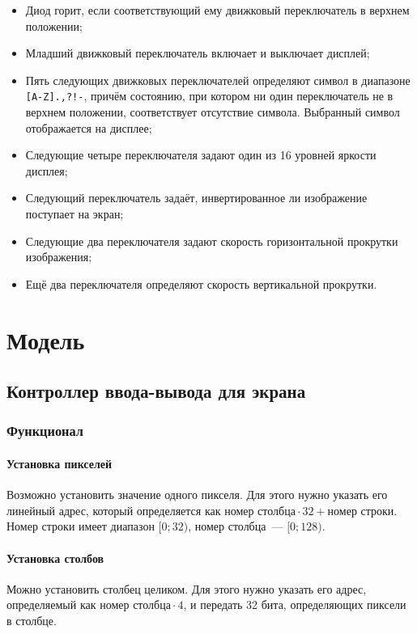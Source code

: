 \documentclass[12pt, a4paper] {ncc}
\begin{document}
\begin{itemize}
        \item Диод горит, если соответствующий ему движковый переключатель в
                верхнем положении;
        \item Младший движковый переключатель включает и выключает дисплей;
        \item Пять следующих движковых переключателей определяют символ в
                диапазоне \texttt{[A-Z].,?!-}, причём состоянию, при котором ни
                один переключатель не в верхнем положении, соответствует
                отсутствие символа. Выбранный символ отображается на дисплее;
        \item Следующие четыре переключателя задают один из 16 уровней яркости
                дисплея;
        \item Следующий переключатель задаёт, инвертированное ли изображение
                поступает на экран;
        \item Следующие два переключателя задают скорость горизонтальной
                прокрутки изображения;
        \item Ещё два переключателя определяют скорость вертикальной прокрутки.
\end{itemize}

\section{Модель}

\subsection{Контроллер ввода-вывода для экрана}

\subsubsection{Функционал}

\paragraph{Установка пикселей} Возможно установить значение одного пикселя. Для
этого нужно указать его линейный адрес, который определяется как $\textit{номер
столбца} \cdot 32 + \textit{номер строки}$. Номер строки имеет диапазон $[0;
32)$, номер столбца~--- $[0; 128)$.

\paragraph{Установка столбов} Можно установить столбец целиком. Для этого нужно
указать его адрес, определяемый как $\textit{номер столбца} \cdot 4$, и
передать 32 бита, определяющих пиксели в столбце.
\end{document}
